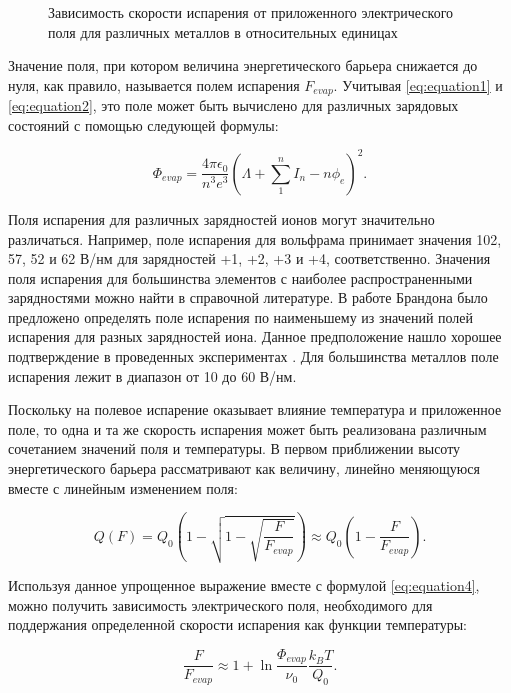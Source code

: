 \begin{figure}[ht]
	\caption{Зависимость скорости испарения от приложенного электрического поля для различных металлов в относительных единицах~\cite{Tsong78}}
	\label{fig:evapspeed}
\end{figure} 

Значение поля, при котором величина энергетического барьера снижается до нуля, как правило, называется полем испарения $F_{evap}$. Учитывая \cref{eq:equation1} и \cref{eq:equation2}, это поле может быть вычислено для различных зарядовых состояний с помощью следующей формулы: 

\begin{equation}
	\label{eq:equation5}
	\Phi_{evap} = \frac{4\pi\epsilon_0}{n^3 e^3}(\Lambda + \sum_{1}^{n} I_n - n\phi_e)^2.
\end{equation}

Поля испарения для различных зарядностей ионов могут значительно различаться. Например, поле испарения для вольфрама принимает значения 102, 57, 52 и 62 В/нм для зарядностей +1, +2, +3 и +4, соответственно. Значения поля испарения для большинства элементов с наиболее распространенными зарядностями можно найти в справочной литературе. В работе Брандона \cite{Brandon65} было предложено определять поле испарения по наименьшему из значений полей испарения для разных зарядностей иона. Данное предположение нашло хорошее подтверждение в проведенных экспериментах \cite{Tsong782}. Для большинства металлов поле испарения лежит в диапазон от 10 до 60 В/нм.

Поскольку на полевое испарение оказывает влияние температура и приложенное поле, то одна и та же скорость испарения может быть реализована различным сочетанием значений поля и температуры. В первом приближении высоту энергетического барьера рассматривают как величину, линейно меняющуюся вместе с линейным изменением поля:
 
\begin{equation}
	\label{eq:equation6}
	Q(F) = Q_0(1 - \sqrt{1 - \sqrt{\frac{F}{F_{evap}}}}) \approx Q_0 (1 - \frac{F}{F_{evap}}).
\end{equation}

Используя данное упрощенное выражение вместе с формулой \cref{eq:equation4}, можно получить зависимость электрического поля, необходимого для поддержания определенной скорости испарения как функции температуры:

\begin{equation}
	\label{eq:equation7}
	\frac{F}{F_{evap}} \approx 1 + \ln{\frac{\Phi_{evap}}{\nu_0}\frac{k_B T}{Q_0}}.
\end{equation}

